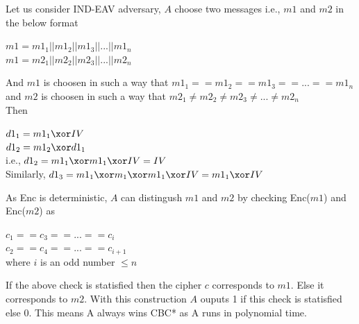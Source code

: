 Let us consider IND-EAV adversary, $A$ choose two messages i.e., $m1$ and $m2$ in the below format

\begin{center}
    $m1 = m1_1|| m1_2||m1_3|| ... ||m1_n$\\
    $m1 = m2_1|| m2_2||m2_3|| ... ||m2_n$
\end{center}

And $m1$ is choosen in such a way that $m1_1 ==  m1_2 == m1_3 == ... == m1_n$ and
$m2$ is choosen in such a way that $m2_1 \neq  m2_2 \neq m2_3 \neq ... \neq m2_n$\\

Then 
\begin{center}
    $d1_1 = m1_1 \xor IV $\\
    $d1_2 = m1_2 \xor d1_1 $\\
    i.e., $d1_2 = m1_1 \xor m1_1 \xor IV  = IV$\\
    Similarly, $d1_3 = m1_1 \xor m_1 \xor m1_1 \xor IV = m1_1 \xor IV $\\
\end{center}

As Enc is deterministic, $A$ can distingush $m1$ and $m2$ by checking Enc($m1$) and Enc($m2$) as
\begin{center}
    $c_1 == c_3 == ... == c_i$\\
    $c_2 == c_4 == ...  == c_{i+1}$\\
    where $i$ is an odd number $ \leq n$
\end{center}

If the above check is statisfied then the cipher $c$ corresponds to $m1$. Else it corresponds to $m2$.
With this construction $A$ ouputs 1 if this check is statisfied else 0. This means A always wins CBC* as A runs in polynomial time.
